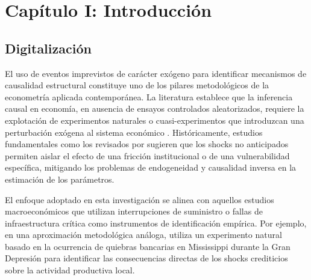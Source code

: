\begin{abstract}
La evidencia obtenida contribuye a la literatura sobre econom\'ia de redes, sistemas de pagos y riesgo sist\'emico, al mostrar que la resiliencia econ\'omica contempor\'anea depende crecientemente de la estabilidad de infraestructuras tecnol\'ogicas cuya relevancia excede el \'ambito estrictamente financiero.
\end{abstract}


\newpage
\label{indice}
\tableofcontents
\pagestyle{empty}
\clearpage
\pagestyle{empty}
\clearpage
\newpage


\clearpage
{}
\setcounter{page}{1}
\pagestyle{plain}

\section{Cap\'itulo I: Introducci\'on}\label{capitulo1}

\subsection{Digitalizaci\'on}
\label{sec:1_1}

El uso de eventos imprevistos de car\'acter ex\'ogeno para identificar mecanismos de causalidad estructural constituye uno de los pilares metodol\'ogicos de la econometr\'ia aplicada contempor\'anea. La literatura establece que la inferencia causal en econom\'ia, en ausencia de ensayos controlados aleatorizados, requiere la explotaci\'on de experimentos naturales o cuasi-experimentos que introduzcan una perturbaci\'on ex\'ogena al sistema econ\'omico \citep{meyer1995natural}. Hist\'oricamente, estudios fundamentales como los revisados por \citep{rosenzweig2000natural} sugieren que los shocks no anticipados permiten aislar el efecto de una fricci\'on institucional o de una vulnerabilidad espec\'ifica, mitigando los problemas de endogeneidad y causalidad inversa en la estimaci\'on de los par\'ametros.

El enfoque adoptado en esta investigaci\'on se alinea con aquellos estudios macroecon\'omicos que utilizan interrupciones de suministro o fallas de infraestructura cr\'itica como instrumentos de identificaci\'on emp\'irica. Por ejemplo, en una aproximaci\'on metodol\'ogica an\'aloga, \citep{ziebarth2013identifying} utiliza un experimento natural basado en la ocurrencia de quiebras bancarias en Mississippi durante la Gran Depresi\'on para identificar las consecuencias directas de los shocks crediticios sobre la actividad productiva local.

